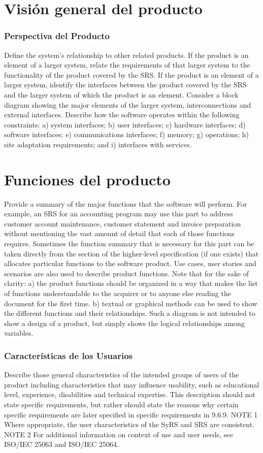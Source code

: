 \documentclass[12pt, a4paper, twoside]{article}
\begin{document}
\section{Visión general del producto}
\subsubsection{Perspectiva del Producto}
 Define the system's relationship to other related products.
 If the product is an element of a larger system, relate the requirements of that larger system to the
 functionality of the product covered by the SRS.
 If the product is an element of a larger system, identify the interfaces between the product covered by
 the SRS and the larger system of which the product is an element.
 Consider a block diagram showing the major elements of the larger system, interconnections and
 external interfaces.
 Describe how the software operates within the following constraints:
 a) system interfaces;
 b) user interfaces;
 c) hardware interfaces;
 d) software interfaces;
 e) communications interfaces;
 f) memory;
 g) operations;
 h) site adaptation requirements; and
 i) interfaces with services.

 \section{Funciones del producto}
 Provide a summary of the major functions that the software will perform. For example, an SRS for an
 accounting program may use this part to address customer account maintenance, customer statement
 and invoice preparation without mentioning the vast amount of detail that each of those functions
 requires.
 Sometimes the function summary that is necessary for this part can be taken directly from the section
 of the higher-level specification (if one exists) that allocates particular functions to the software
 product.
 Use cases, user stories and scenarios are also used to describe product functions.
 Note that for the sake of clarity:
 a) the product functions should be organized in a way that makes the list of functions understandable
 to the acquirer or to anyone else reading the document for the first time.
 b) textual or graphical methods can be used to show the different functions and their relationships.
 Such a diagram is not intended to show a design of a product, but simply shows the logical
 relationships among variables.

 \subsubsection{Características de los Usuarios}
 Describe those general characteristics of the intended groups of users of the product including
 characteristics that may influence usability, such as educational level, experience, disabilities and
 technical expertise. This description should not state specific requirements, but rather should state the
 reasons why certain specific requirements are later specified in specific requirements in 9.6.9.
 NOTE 1 Where appropriate, the user characteristics of the SyRS and SRS are consistent.
 NOTE 2 For additional information on context of use and user needs, see ISO/IEC 25063 and ISO/IEC 25064.
\end{document}
